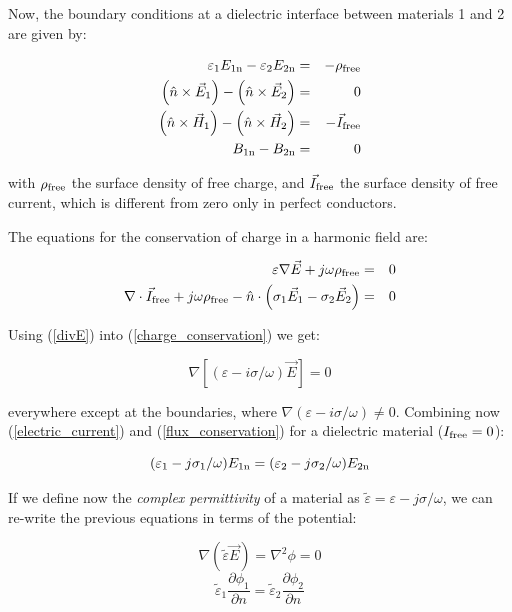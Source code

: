 \documentclass[12pt]{report}
\begin{document}
Now, the boundary conditions at a dielectric interface between materials 1 and 2 are given by:

\begin{eqnarray}
\varepsilon_1E_{1\rm{n}}-\varepsilon_2E_{2\rm{n}}&=&-\rho_{\rm{free}}\\
\left(\hat{n}\times\vec{E}_1\right)-\left(\hat{n}\times\vec{E}_2\right)&=&0\\
\left(\hat{n}\times\vec{H}_1\right)-\left(\hat{n}\times\vec{H}_2\right)&=&-\vec{I}_{\rm{free}}\\B_{1\rm{n}}-B_{2\rm{n}}&=&0
\end{eqnarray}

with $\rho_{\rm free}$ the surface density of free charge, and $\vec{I}_{\rm free}$ the surface density of free current, which is different from zero only in perfect conductors.

The equations for the conservation of charge in a harmonic field are:

\begin{eqnarray}\varepsilon\nabla\vec{E}+j\omega\rho_{\rm free}&=&0\label{charge_conservation}\\\nabla\cdot\vec{I}_{\rm free}+j\omega\rho_{\rm free}-\hat{n}\cdot\left(\sigma_1\vec{E}_1-\sigma_2\vec{E}_2\right)&=& 0\label{flux_conservation}\end{eqnarray}

Using (\ref{divE}) into (\ref{charge_conservation}) we get:

\begin{equation}\nabla\left[(\varepsilon-i\sigma/\omega)\vec{E}\right]=0\end{equation}

everywhere except at the boundaries, where $\nabla(\varepsilon-i\sigma/\omega)\neq0$. Combining now (\ref{electric_current}) and (\ref{flux_conservation}) for a dielectric material ($I_{\rm free}=0$):

\begin{equation}(\varepsilon_1-j\sigma_1/\omega)E_{1\rm n}=(\varepsilon_2-j\sigma_2/\omega)E_{2\rm n}\end{equation}

If we define now the {\it complex permittivity} of a material as $\tilde{\varepsilon}=\varepsilon-j\sigma/\omega$, we can re-write the previous equations in terms of the potential:

\begin{equation}\nabla\left(\tilde{\varepsilon}\vec{E}\right)=\nabla^2\phi=0\end{equation}
\begin{equation}\tilde{\varepsilon}_1\frac{\partial\phi_1}{\partial n}=\tilde{\varepsilon}_2\frac{\partial\phi_2}{\partial n}\end{equation}
\end{document}
